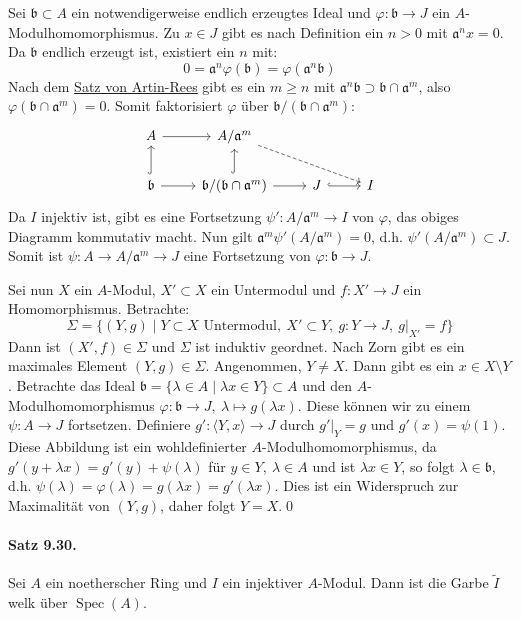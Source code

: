 Sei $\mathfrak{b}\subset A$ ein notwendigerweise endlich erzeugtes Ideal und $\varphi:\mathfrak{b}\to J$ ein $A$-Modulhomomorphismus. Zu $x\in J$ gibt es nach Definition ein $n>0$ mit $\mathfrak{a}^nx=0$. Da $\mathfrak{b}$ endlich erzeugt ist, existiert ein $n$ mit:
\[0=\mathfrak{a}^n\varphi(\mathfrak{b})=\varphi(\mathfrak{a}^n\mathfrak{b}) \]
Nach dem \hyperref[prop:artin-rees]{Satz von Artin-Rees} gibt es ein $m\geq n$ mit $\mathfrak{a}^n\mathfrak{b}\supset\mathfrak{b}\cap\mathfrak{a}^m$, also $\varphi(\mathfrak{b}\cap\mathfrak{a}^m)=0$. Somit faktorisiert $\varphi$ über $\mathfrak{b}/(\mathfrak{b}\cap\mathfrak{a}^m)$:
\[\begin{tikzcd}
A \rar & A/\mathfrak{a}^m\ar[rrd, dashed] &&\\
\mathfrak{b} \uar[hook]\rar & \mathfrak{b}/(\mathfrak{b}\cap\mathfrak{a}^m) \uar[hook]\rar & J\rar[hook] & I
\end{tikzcd}\]
Da $I$ injektiv ist, gibt es eine Fortsetzung $\psi':A/\mathfrak{a}^m\to I$ von $\varphi$, das obiges Diagramm kommutativ macht. Nun gilt $\mathfrak{a}^m\psi'(A/\mathfrak{a}^m)=0$, d.h. $\psi'(A/\mathfrak{a}^m)\subset J$. Somit ist $\psi:A\to A/\mathfrak{a}^m\to J$ eine Fortsetzung von $\varphi:\mathfrak{b}\to J$.

Sei nun $X$ ein $A$-Modul, $X'\subset X$ ein Untermodul und $f:X'\to J$ ein Homomorphismus. Betrachte:
\[\Sigma=\{(Y,g)\mid Y\subset X\text{ Untermodul},\ X'\subset Y,\ g:Y\to J,\ g|_{X'}=f \} \]
Dann ist $(X',f)\in\Sigma$ und $\Sigma$ ist induktiv geordnet. Nach Zorn gibt es ein maximales Element $(Y,g)\in\Sigma$. Angenommen, $Y\neq X$. Dann gibt es ein $x\in X\setminus Y$. Betrachte das Ideal $\mathfrak{b}=\{\lambda\in A\mid\lambda x\in Y\}\subset A$ und den $A$-Modulhomomorphismus $\varphi:\mathfrak{b}\to J,\ \lambda\mapsto g(\lambda x)$. Diese können wir zu einem $\psi:A\to J$ fortsetzen. Definiere $g':\langle Y,x\rangle\to J$ durch $g'|_Y=g$ und $g'(x)=\psi(1)$. Diese Abbildung ist ein wohldefinierter $A$-Modulhomomorphismus, da $g'(y+\lambda x)=g'(y)+\psi(\lambda)$ für $y\in Y,\ \lambda\in A$ und ist $\lambda x\in Y$, so folgt $\lambda\in\mathfrak{b}$, d.h. $\psi(\lambda)=\varphi(\lambda)=g(\lambda x)=g'(\lambda x)$. Dies ist ein Widerspruch zur Maximalität von $(Y,g)$, daher folgt $Y=X$.\qed

\paragraph{Satz 9.30.}\label{9.30} Sei $A$ ein noetherscher Ring und $I$ ein injektiver $A$-Modul. Dann ist die Garbe $\widetilde{I}$ welk über $\operatorname{Spec}(A)$.

